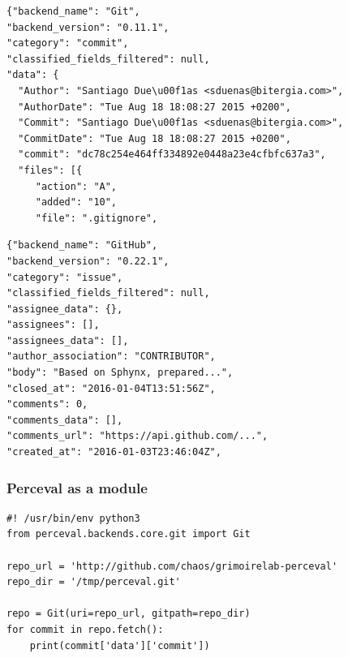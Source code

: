 \documentclass[17pt,aspectratio=169,hyperref=pdfusetitle]{beamer}
\begin{document}

\begin{frame}[fragile]

{\footnotesize
\begin{verbatim}
{"backend_name": "Git",
"backend_version": "0.11.1",
"category": "commit",
"classified_fields_filtered": null,
"data": {
  "Author": "Santiago Due\u00f1as <sduenas@bitergia.com>",
  "AuthorDate": "Tue Aug 18 18:08:27 2015 +0200",
  "Commit": "Santiago Due\u00f1as <sduenas@bitergia.com>",
  "CommitDate": "Tue Aug 18 18:08:27 2015 +0200",
  "commit": "dc78c254e464ff334892e0448a23e4cfbfc637a3",
  "files": [{
     "action": "A",
     "added": "10",
     "file": ".gitignore",
\end{verbatim}
}
\end{frame}


\begin{frame}[fragile]

{\footnotesize
\begin{verbatim}
{"backend_name": "GitHub",
"backend_version": "0.22.1",
"category": "issue",
"classified_fields_filtered": null,
"assignee_data": {},
"assignees": [],
"assignees_data": [],
"author_association": "CONTRIBUTOR",
"body": "Based on Sphynx, prepared...",
"closed_at": "2016-01-04T13:51:56Z",
"comments": 0,
"comments_data": [],
"comments_url": "https://api.github.com/...",
"created_at": "2016-01-03T23:46:04Z",
\end{verbatim}
}
\end{frame}


\begin{frame}[fragile]
  \frametitle{Perceval as a module}
  
{\footnotesize
\begin{verbatim}
#! /usr/bin/env python3
from perceval.backends.core.git import Git

repo_url = 'http://github.com/chaos/grimoirelab-perceval'
repo_dir = '/tmp/perceval.git'

repo = Git(uri=repo_url, gitpath=repo_dir)
for commit in repo.fetch():
    print(commit['data']['commit'])
\end{verbatim}
}
\end{frame}

\end{document}
